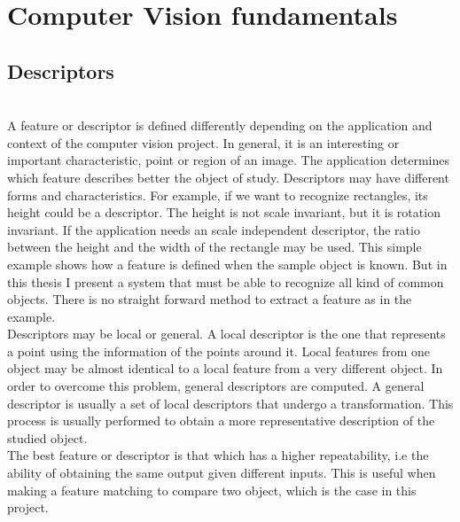 \chapter{Computer Vision fundamentals}



\section{Descriptors}
\label{descriptors}

\\
A feature or descriptor is defined differently depending on the application and context of the computer vision project. 
In general, it is an interesting or important characteristic, point or region of an image. 
The application determines which feature describes better the object of study. 
Descriptors may have different forms and characteristics. 
For example, if we want to recognize rectangles, its height could be a descriptor.
The height is not scale invariant, but it is rotation invariant. 
If the application needs an scale independent descriptor, the ratio between the height and the width of the rectangle may be used. 
This simple example shows how a feature is defined when the sample object is known. 
But in this thesis I present a system that must be able to recognize all kind of common objects. 
There is no straight forward method to extract a feature as in the example. 
\\

Descriptors may be local or general. 
A local descriptor is the one that represents a point using the information of the points around it. 
Local features from one object may be almost identical to a local feature from a very different object. 
In order to overcome this problem, general descriptors are computed. 
A general descriptor is usually a set of local descriptors that undergo a transformation. 
This process is usually performed to obtain a more representative description of the studied object. 
\\

The best feature or descriptor is that which has a higher repeatability, i.e the ability of obtaining the same output given different inputs. 
This is useful when making a feature matching to compare two object, which is the case in this project. 
\\

